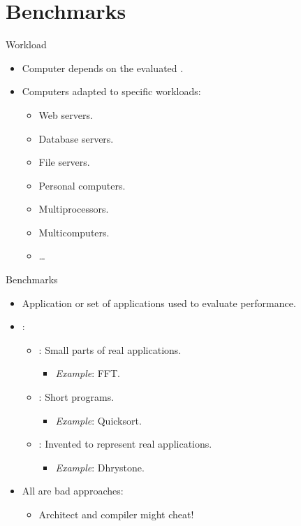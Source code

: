 \section{Benchmarks}

\begin{frame}[t]{Workload}
\begin{itemize}
  \item Computer  depends on the
        evaluated .

  \item Computers adapted to specific workloads:
    \begin{itemize}
      \item Web servers.
      \item Database servers.
      \item File servers.
      \item Personal computers.
      \item Multiprocessors.
      \item Multicomputers.
      \item \ldots
    \end{itemize}
\end{itemize}
\end{frame}

\begin{frame}[t]{Benchmarks}
\begin{itemize}
  \item Application or set of applications used to evaluate performance.

  \item {}:
    \begin{itemize}
      \item {}: Small parts of real applications.
        \begin{itemize}
          \item \emph{Example}: FFT.
        \end{itemize}
      \item {}: Short programs.
        \begin{itemize}
          \item \emph{Example}: Quicksort.
        \end{itemize}
      \item {}: 
            Invented to represent real applications.
        \begin{itemize}
          \item \emph{Example}: Dhrystone.
        \end{itemize}
    \end{itemize}

  \item All are bad approaches:
    \begin{itemize}
      \item \alert{Architect and compiler might cheat!}
    \end{itemize}
\end{itemize}
\end{frame}

